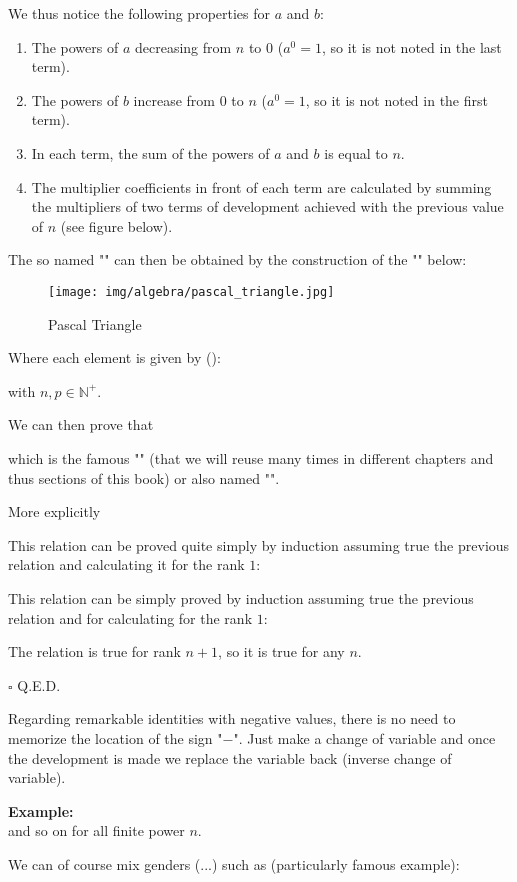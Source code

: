 	We thus notice the following properties for $a$ and $b$:
	\begin{enumerate}
		\item The powers of $a$ decreasing from $n$ to $0$ ($a^0=1$, so it is not noted in the last term).
		
		\item The powers of $b$ increase from $0$ to $n$ ($a^0=1$, so it is not noted in the first term).
		
		\item In each term, the sum of the powers of $a$ and $b$ is equal to $n$.
		
		\item The multiplier coefficients in front of each term are calculated by summing the multipliers of two terms of development achieved with the previous value of $n$ (see figure below).
	\end{enumerate}
	The so named "" can then be obtained by the construction of the "\label{Pascal's triangle}" below:
	\begin{figure}[H]
		\centering
		\texttt{[image: img/algebra/pascal\_triangle.jpg]}
		\caption{Pascal Triangle}
	\end{figure}
	Where each element is given by ():
	
	with $n,p\in \mathbb{N}^{+}$.
	\begin{theorem}
	We can then prove that\label{binomial theorem}
	
	which is the famous "" (that we will reuse many times in different chapters and thus sections of this book) or also named "".
	
	More explicitly\label{binomial coefficient development}
	
	\end{theorem}
	\begin{dem}
	This relation can be proved quite simply by induction assuming true the previous relation and calculating it for the rank $1$:
	
	This relation can be simply proved by induction assuming true the previous relation and for calculating for the rank $1$:
	
	The relation is true for rank $n + 1$, so it is true for any $n$.
	\begin{flushright}
		$\square$  Q.E.D.
	\end{flushright}
	\end{dem} 
	Regarding remarkable identities with negative values, there is no need to memorize the location of the sign "$-$". Just make a change of variable and once the development is made we replace the variable back (inverse change of variable).
	\begin{tcolorbox}[colframe=black,colback=white,sharp corners]
	\textbf{{\Large {}}Example:}\\
	
	and so on for all finite power $n$.
	\end{tcolorbox}
	We can of course mix genders (...) such as (particularly famous example):
	
